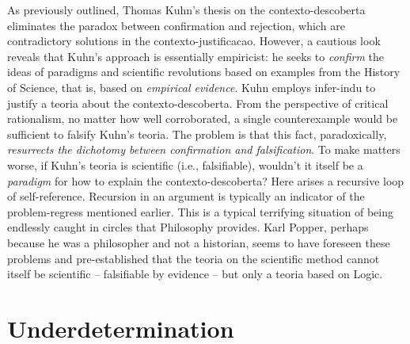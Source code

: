 \documentclass[./main_en.tex]{subfiles}
\begin{document}
\par As previously outlined, Thomas Kuhn's thesis on the \gls{contexto-descoberta} eliminates the paradox between confirmation and rejection, which are contradictory solutions in the \gls{contexto-justificacao}. However, a cautious look reveals that Kuhn's approach is essentially empiricist: he seeks to \textit{confirm} the ideas of paradigms and scientific revolutions based on examples from the History of Science, that is, based on \textit{empirical evidence}. Kuhn employs \gls{infer-indu} to justify a \gls{teoria} about the \gls{contexto-descoberta}. From the perspective of critical rationalism, no matter how well corroborated, a single counterexample would be sufficient to falsify Kuhn's \gls{teoria}. The problem is that this fact, paradoxically, \textit{resurrects the dichotomy between confirmation and falsification}. To make matters worse, if Kuhn's \gls{teoria} is scientific (i.e., falsifiable), wouldn't it itself be a \textit{paradigm} for how to explain the \gls{contexto-descoberta}? Here arises a recursive loop of self-reference. Recursion in an argument is typically an indicator of the \gls{problem-regress} mentioned earlier. This is a typical terrifying situation of being endlessly caught in circles that Philosophy provides. Karl Popper, perhaps because he was a philosopher and not a historian, seems to have foreseen these problems and pre-established that the \gls{teoria} on the scientific method cannot itself be scientific – falsifiable by evidence – but only a \gls{teoria} based on Logic.

\section{Underdetermination} \label{sec:epis:under}
\end{document}
